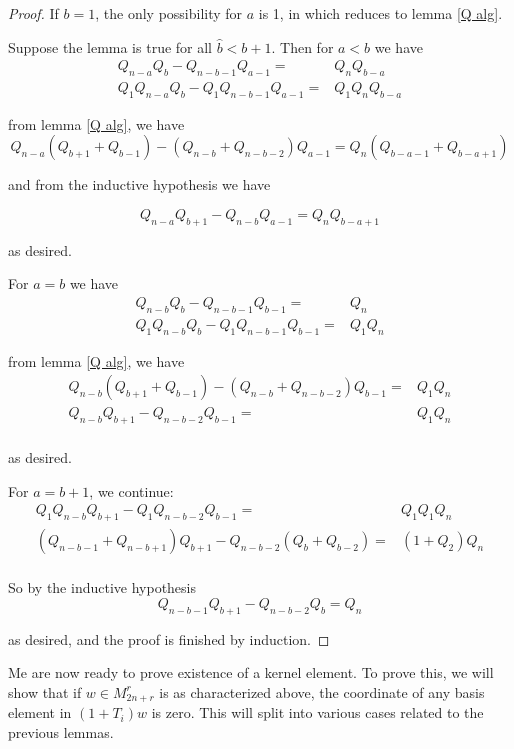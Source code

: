 \documentclass{amsart}
\begin{document}
 \begin{proof}
 	If $b=1$, the only possibility for $a$ is 1, in which reduces to lemma \ref{Q alg}.
 	
 	Suppose the lemma is true for all $\widehat{b}<b+1$. Then for $a< b$ we have 
 	\begin{align*}	
 	Q_{n-a}Q_b -Q_{n-b-1}Q_{a-1}=&Q_{n}Q_{b-a}\\
 	Q_1Q_{n-a}Q_b-Q_1Q_{n-b-1}Q_{a-1}=&Q_1Q_{n}Q_{b-a}
 	\end{align*}
 	
 	from lemma \ref{Q alg}, we have	
 	$$Q_{n-a}(Q_{b+1}+Q_{b-1})-(Q_{n-b}+Q_{n-b-2})Q_{a-1}=Q_{n}(Q_{b-a-1}+Q_{b-a+1})$$
 	
 	and from the inductive hypothesis we have
 	
 	$$Q_{n-a}Q_{b+1}-Q_{n-b}Q_{a-1}=Q_{n}Q_{b-a+1}$$
 	
 	as desired.
 	
 	For $a=b$ we have 
 	\begin{align*}
 	Q_{n-b}Q_b -Q_{n-b-1}Q_{b-1}=&Q_{n}\\
 	Q_1Q_{n-b}Q_b-Q_1Q_{n-b-1}Q_{b-1}=&Q_1Q_{n}
 	\end{align*}
 	
 	from lemma \ref{Q alg}, we have
 	\begin{align*}
 	Q_{n-b}(Q_{b+1}+Q_{b-1})-(Q_{n-b}+Q_{n-b-2})Q_{b-1}=&Q_1Q_{n}\\
 	Q_{n-b}Q_{b+1}-Q_{n-b-2}Q_{b-1}=&Q_1Q_{n}\\
 	\end{align*}
 	
 	as desired.
 	
 	For $a=b+1$, we continue:
 	\begin{align*}
 	Q_1Q_{n-b}Q_{b+1}-Q_1Q_{n-b-2}Q_{b-1}=&Q_1Q_1Q_{n}\\
 	(Q_{n-b-1}+Q_{n-b+1})Q_{b+1}-Q_{n-b-2}(Q_{b}+Q_{b-2})=&(1+Q_2)Q_{n}\\
 	\end{align*}
 	
 	So by the inductive hypothesis
 	$$Q_{n-b-1}Q_{b+1}-Q_{n-b-2}Q_{b}=Q_{n}$$
 	
 	as desired, and the proof is finished by induction.
 	
 \end{proof}
 
 \vspace{5mm}
 Me are now ready to prove existence of a kernel element. To prove this, we will show that if $w\in M_{2n+r}^r$ is as characterized above, the coordinate of any basis element in $(1+T_i)w$ is zero. This will split into various cases related to the previous lemmas.
 
\end{document}
